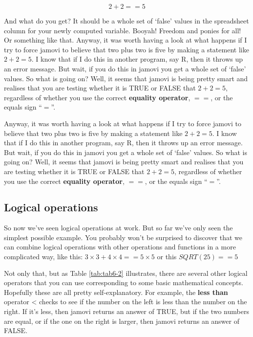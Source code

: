 \documentclass[
]{book}
\begin{document}
\[2 + 2 == 5\]

And what do you get? It should be a whole set of `false' values in the spreadsheet column for your newly computed variable. Booyah! Freedom and ponies for all! Or something like that. Anyway, it was worth having a look at what happens if I try to force jamovi to believe that two plus two is five by making a statement like \(2 + 2 = 5\). I know that if I do this in another program, say R, then it throws up an error message. But wait, if you do this in jamovi you get a whole set of `false' values. So what is going on? Well, it seems that jamovi is being pretty smart and realises that you are testing whether it is TRUE or FALSE that \(2 + 2 = 5\), regardless of whether you use the correct \textbf{equality operator}, \(==\), or the equals sign ``\(=\)''.

Anyway, it was worth having a look at what happens if I try to force jamovi to believe that two plus two is five by making a statement like \(2 + 2 = 5\). I know that if I do this in another program, say R, then it throws up an error message. But wait, if you do this in jamovi you get a whole set of `false' values. So what is going on? Well, it seems that jamovi is being pretty smart and realises that you are testing whether it is TRUE or FALSE that \(2 + 2 = 5\), regardless of whether you use the correct \textbf{equality operator}, \(==\), or the equals sign ``\(=\)''.

\hypertarget{logical-operations}{%
\subsection{Logical operations}\label{logical-operations}}

So now we've seen logical operations at work. But so far we've only seen the simplest possible example. You probably won't be surprised to discover that we can combine logical operations with other operations and functions in a more complicated way, like this: \(3 \times 3 + 4 \times 4 == 5 \times 5\) or this \(SQRT(25) == 5\)

Not only that, but as Table \ref{tab:tab6-2} illustrates, there are several other logical operators that you can use corresponding to some basic mathematical concepts. Hopefully these are all pretty self-explanatory. For example, the \textbf{less than} operator \textless{} checks to see if the number on the left is less than the number on the right. If it's less, then jamovi returns an answer of TRUE, but if the two numbers are equal, or if the one on the right is larger, then jamovi returns an answer of FALSE.
\end{document}
